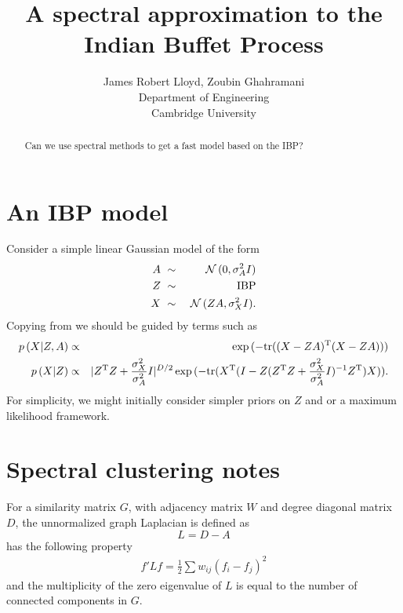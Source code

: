 \documentclass{article}
\title{
A spectral approximation to the Indian Buffet Process
}
\author{
James Robert Lloyd, Zoubin Ghahramani\\
Department of Engineering\\
Cambridge University\\
}
\numberwithin{equation}{section}
\numberwithin{thm}{section}
\def\IBP{Z}
\def\Weights{A}
\def\Data{X}
\def\Graph{G}
\def\Adjacency{W}
\def\Degree{D}
\def\Laplacian{L}
\begin{document}
\maketitle

\begin{abstract}
Can we use spectral methods to get a fast model based on the IBP?
\end{abstract}

\section{An IBP model}

Consider a simple linear Gaussian model of the form
\begin{eqnarray}
\Weights & \dist & \Normal\,(0, \sigma_\Weights^2 I) \\
\IBP & \dist & \textrm{IBP} \\
\Data & \dist & \Normal\,(\IBP \Weights, \sigma_\Data^2 I).
\end{eqnarray}
Copying from \cite{Griffiths2011} we should be guided by terms such as
\begin{eqnarray}
p\,(\Data | \IBP, \Weights) & \propto & \exp\,(-\textrm{tr}((\Data - \IBP\Weights)\Transpose(\Data - \IBP\Weights))) \\
p\,(\Data | \IBP) & \propto & |\IBP\Transpose\IBP + \frac{\sigma_\Data^2}{\sigma_\Weights^2}I|^{D/2} \exp\,(-\textrm{tr}(\Data\Transpose(I - \IBP(\IBP\Transpose\IBP + \frac{\sigma_\Data^2}{\sigma_\Weights^2}I)^{-1}\IBP\Transpose)\Data)).
\end{eqnarray}
For simplicity, we might initially consider simpler priors on $\IBP$ and or a maximum likelihood framework.
\section{Spectral clustering notes}

For a similarity matrix $\Graph$, with adjacency matrix $\Adjacency$ and degree diagonal matrix $\Degree$, the unnormalized graph Laplacian is defined as
\begin{equation}
\Laplacian = \Degree - \Weights
\end{equation}
has the following property \citep{Luxburg2007}
\begin{eqnarray}
f' \Laplacian f = \frac{1}{2}\sum w_{ij}(f_i - f_j)^2
\end{eqnarray}
and the multiplicity of the zero eigenvalue of $\Laplacian$ is equal to the number of connected components in $\Graph$.
\end{document}
